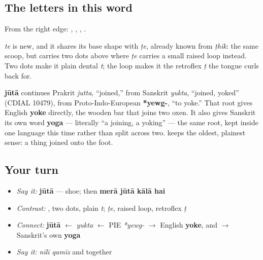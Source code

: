 \subsection*{The letters in this word}
From the right edge: \textbf{}, \textbf{}, \textbf{}, \textbf{}.

\textbf{} \emph{te} is new, and it shares its base shape with \emph{ṭe}, already known from \emph{ṭhīk}: the same scoop, but \textbf{} carries two dots above where \emph{ṭe} carries a small raised loop instead. Two dots make it plain dental \emph{t}; the loop makes it the retroflex \emph{ṭ} the tongue curls back for.

\begin{cousinweb}
\textbf{jūtā} continues Prakrit \emph{jutta}, \textquotedblleft{}joined,\textquotedblright{} from Sanskrit \emph{yukta}, \textquotedblleft{}joined, yoked\textquotedblright{} (CDIAL 10479), from Proto-Indo-European \textbf{*yewg-}, \textquotedblleft{}to yoke.\textquotedblright{} That root gives English \textbf{yoke} directly, the wooden bar that joins two oxen. It also gives Sanskrit its own word \textbf{yoga} — literally \textquotedblleft{}a joining, a yoking\textquotedblright{} — the same root, kept inside one language this time rather than split across two. \textbf{} keeps the oldest, plainest sense: a thing joined onto the foot.
\end{cousinweb}

\subsection*{Your turn}
\begin{itemize}
\raggedright
  \item \emph{Say it:} \textbf{jūtā} — shoe; then \textbf{merā jūtā kālā hai}
  \item \emph{Contrast:} \textbf{}, two dots, plain \emph{t}; \emph{ṭe}, raised loop, retroflex \emph{ṭ}
  \item \emph{Connect:} \textbf{jūtā} $\leftarrow$ \emph{yukta} $\leftarrow$ PIE \emph{*yewg-} $\to$ English \textbf{yoke}, and $\to$ Sanskrit's own \textbf{yoga}
  \item \emph{Say it:} \emph{nīlī qamīz} and \textbf{ } together
\end{itemize}


